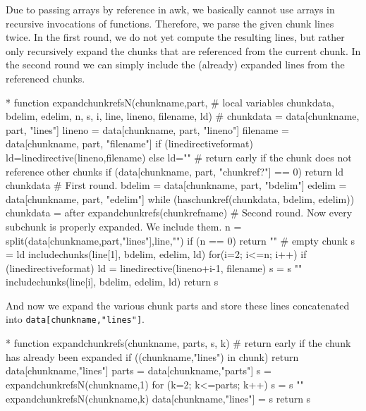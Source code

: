 \documentclass[a4paper]{article} %
\newcommand{\packagename}[1]{{\normalfont\sffamily#1}}
\begin{document}
Due to passing arrays by reference in \packagename{awk}, we basically
cannot use arrays in recursive invocations of functions. Therefore, we
parse the given chunk lines twice. In the first round, we do not yet
compute the resulting lines, but rather only recursively expand the
chunks that are referenced from the current chunk. In the second round
we can simply include the (already) expanded lines from the referenced
chunks.
\begin{chunk}{*}
function expandchunkrefsN(chunkname,part,
  # local variables
  chunkdata, bdelim, edelim, n, s, i, line, lineno, filename, ld) {
  #
  chunkdata = data[chunkname, part, "lines"]
  lineno    = data[chunkname, part, "lineno"]
  filename  = data[chunkname, part, "filename"]
  if (linedirectiveformat) {ld=linedirective(lineno,filename)} else {ld=""}
  # return early if the chunk does not reference other chunks
  if (data[chunkname, part, "chunkref?"] == 0) {return ld chunkdata}
  # First round.
  bdelim = data[chunkname, part, "bdelim"]
  edelim = data[chunkname, part, "edelim"]
  while (haschunkref(chunkdata, bdelim, edelim)) {
    chunkdata = after
    expandchunkrefs(chunkrefname)
  }
  # Second round. Now every subchunk is properly expanded. We include them.
  n = split(data[chunkname,part,"lines"],line,"\n")
  if (n == 0) {return ""} # empty chunk
  s = ld includechunks(line[1], bdelim, edelim, ld)
  for(i=2; i<=n; i++) {
    if (linedirectiveformat) {ld = linedirective(lineno+i-1, filename)}
    s = s "\n" includechunks(line[i], bdelim, edelim, ld)}
  return s
}
\end{chunk}

And now we expand the various chunk parts and store these lines
concatenated into \texttt{data[chunkname,"lines"]}.
\begin{chunk}{*}
function expandchunkrefs(chunkname,   parts, s, k) {
  # return early if the chunk has already been expanded
  if ((chunkname,"lines") in chunk) { return data[chunkname,"lines"] }
  parts = data[chunkname,"parts"]
  s = expandchunkrefsN(chunkname,1)
  for (k=2; k<=parts; k++) {s = s "\n" expandchunkrefsN(chunkname,k)}
  data[chunkname,"lines"] = s
  return s
}
\end{chunk}
\end{document}

